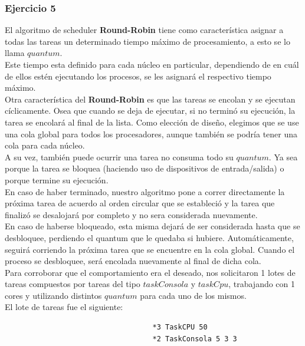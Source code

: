 \subsubsection[Resolución Ejercicio 5]{Ejercicio 5}

\indent El algoritmo de scheduler \textbf{Round-Robin} tiene como caracter\'istica asignar a todas las tareas 
un determinado tiempo m\'aximo de procesamiento, a esto se lo llama $quantum$. \\
\indent Este tiempo esta definido para cada n\'ucleo en particular, dependiendo de en cu\'al de ellos est\'en 
ejecutando los procesos, se les asignar\'a el respectivo tiempo m\'aximo.\\
\indent Otra caracter\'istica del \textbf{Round-Robin} es que las tareas se encolan y se ejecutan c\'iclicamente. 
Osea que cuando se deja de ejecutar, si no termin\'o su ejecuci\'on, la tarea se encolar\'a al final de la lista. 
Como elecci\'on de diseño, elegimos que se use una cola global para todos los procesadores, aunque tambi\'en
se podr\'ia tener una cola para cada n\'ucleo. \\
\indent A su vez, tambi\'en puede ocurrir una tarea no consuma todo su $quantum$. 
Ya sea porque la tarea se bloquea (haciendo uso de dispositivos de entrada/salida) o porque termine su ejecuci\'on.\\
\indent En caso de haber terminado, nuestro algoritmo pone a correr directamente la pr\'oxima tarea de acuerdo al orden 
circular que se estableci\'o y la tarea que finaliz\'o se desalojar\'a por completo y no sera considerada nuevamente. \\
\indent En caso de haberse bloqueado, esta misma dejar\'a de ser considerada hasta que se desbloquee, 
perdiendo el quantum que le quedaba si hubiere. 
Autom\'aticamente, seguir\'a corriendo la pr\'oxima tarea que se encuentre en la cola global. 
Cuando el proceso se desbloquee, ser\'a encolada nuevamente al final de dicha cola.   \\

\indent Para corroborar que el comportamiento era el deseado, nos solicitaron 1 lotes de tareas compuestos por tareas
del tipo $taskConsola$ y $taskCpu$, trabajando con 1 cores y utilizando distintos $quantum$ para cada uno de los mismos.\\

El lote de tareas fue el siguiente:
\begin{verbatim}
                                   *3 TaskCPU 50
                                   *2 TaskConsola 5 3 3
\end{verbatim}

